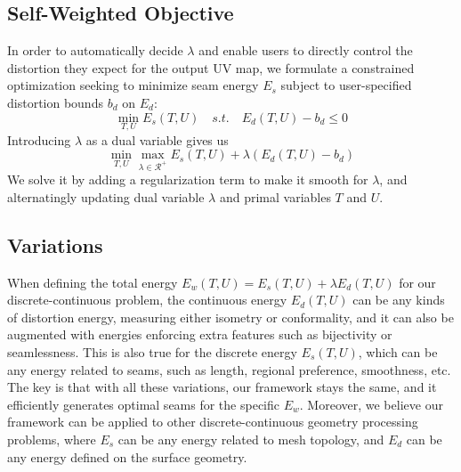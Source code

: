 \subsection{Self-Weighted Objective}

In order to automatically decide $\lambda$ and enable users to directly control the distortion they expect for the output UV map, we formulate a constrained optimization seeking to minimize seam energy $E_s$ subject to user-specified distortion bounds $b_d$ on $E_d$:
\[ \min_{T,U} E_s(T,U) \quad s.t. \quad E_d(T,U) - b_d \leq 0 \]
Introducing $\lambda$ as a dual variable gives us
\[ \min_{T,U} \max_{\lambda \in \mathcal{R^+}} E_s(T,U) + \lambda(E_d(T,U) - b_d) \]
We solve it by adding a regularization term to make it smooth for $\lambda$, and alternatingly updating dual variable $\lambda$ and primal variables $T$ and $U$. 
 
\subsection{Variations}

When defining the total energy $E_w(T,U) = E_s(T,U) + \lambda E_d(T,U)$ for our discrete-continuous problem, the continuous energy $E_d(T,U)$ can be any kinds of distortion energy, measuring either isometry or conformality, and it can also be augmented with energies enforcing extra features such as bijectivity or seamlessness. This is also true for the discrete energy $E_s(T,U)$, which can be any energy related to seams, such as length, regional preference, smoothness, etc. The key is that with all these variations, our framework stays the same, and it efficiently generates optimal seams for the specific $E_w$. Moreover, we believe our framework can be applied to other discrete-continuous geometry processing problems, where $E_s$ can be any energy related to mesh topology, and $E_d$ can be any energy defined on the surface geometry.
